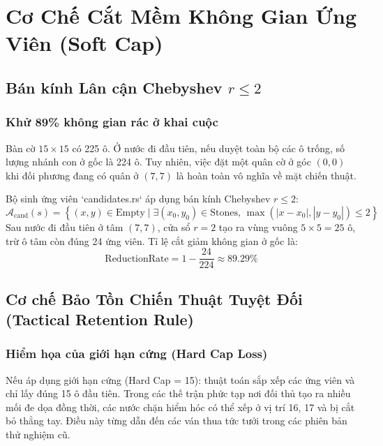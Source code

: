 \documentclass[11pt,a4paper]{report}
\begin{document}
\chapter{Cơ Chế Cắt Mềm Không Gian Ứng Viên (Soft Cap)}

\section{Bán kính Lân cận Chebyshev $r \le 2$}

\subsection{Khử 89\% không gian rác ở khai cuộc}
Bàn cờ $15 \times 15$ có 225 ô. Ở nước đi đầu tiên, nếu duyệt toàn bộ các ô trống, số lượng nhánh con ở gốc là 224 ô. Tuy nhiên, việc đặt một quân cờ ở góc $(0, 0)$ khi đối phương đang có quân ở $(7, 7)$ là hoàn toàn vô nghĩa về mặt chiến thuật.

Bộ sinh ứng viên `candidates.rs` áp dụng bán kính Chebyshev $r \le 2$:
\begin{equation}
    \mathcal{A}_{\text{cand}}(s) = \left\{ (x, y) \in \text{Empty} \mid \exists (x_0, y_0) \in \text{Stones}, \, \max(|x - x_0|, |y - y_0|) \le 2 \right\}
\end{equation}
Sau nước đi đầu tiên ở tâm $(7, 7)$, cửa sổ $r = 2$ tạo ra vùng vuông $5 \times 5 = 25$ ô, trừ ô tâm còn đúng 24 ứng viên. Tỉ lệ cắt giảm không gian ở gốc là:
\begin{equation}
    \text{ReductionRate} = 1 - \frac{24}{224} \approx 89.29\%
\end{equation}

\section{Cơ chế Bảo Tồn Chiến Thuật Tuyệt Đối (Tactical Retention Rule)}

\subsection{Hiểm họa của giới hạn cứng (Hard Cap Loss)}
Nếu áp dụng giới hạn cứng (Hard Cap = 15): thuật toán sắp xếp các ứng viên và chỉ lấy đúng 15 ô đầu tiên. Trong các thế trận phức tạp nơi đối thủ tạo ra nhiều mối đe dọa đồng thời, các nước chặn hiểm hóc có thể xếp ở vị trí 16, 17 và bị cắt bỏ thẳng tay. Điều này từng dẫn đến các ván thua tức tưởi trong các phiên bản thử nghiệm cũ.
\end{document}
